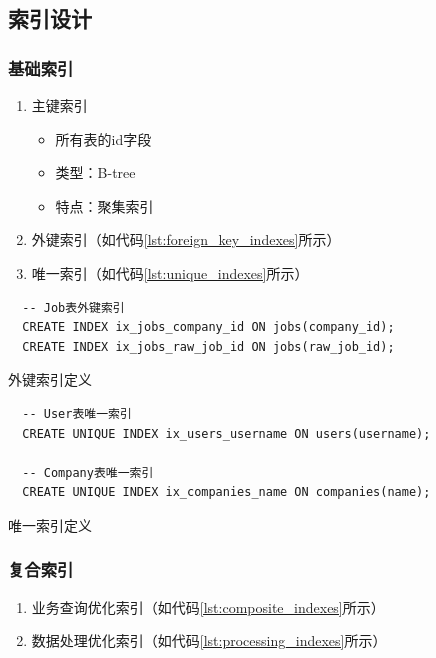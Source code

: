   \subsection{索引设计}
  
  \subsubsection{基础索引}
  
  \begin{enumerate}
    \item 主键索引
    \begin{itemize}
      \item 所有表的id字段
      \item 类型：B-tree
      \item 特点：聚集索引
    \end{itemize}
  
    \item 外键索引（如代码\ref{lst:foreign_key_indexes}所示）
    \item 唯一索引（如代码\ref{lst:unique_indexes}所示）
  \end{enumerate}
  
  \begin{listing}[htbp]
    \begin{verbatim}
  -- Job表外键索引
  CREATE INDEX ix_jobs_company_id ON jobs(company_id);
  CREATE INDEX ix_jobs_raw_job_id ON jobs(raw_job_id);
    \end{verbatim}
    \caption{外键索引定义}\label{lst:foreign_key_indexes}
  \end{listing}
  
  \begin{listing}[htbp]
    \begin{verbatim}
  -- User表唯一索引
  CREATE UNIQUE INDEX ix_users_username ON users(username);
  
  -- Company表唯一索引
  CREATE UNIQUE INDEX ix_companies_name ON companies(name);
    \end{verbatim}
    \caption{唯一索引定义}\label{lst:unique_indexes}
  \end{listing}
  
  \subsubsection{复合索引}
  
  \begin{enumerate}
    \item 业务查询优化索引（如代码\ref{lst:composite_indexes}所示）
    \item 数据处理优化索引（如代码\ref{lst:processing_indexes}所示）
  \end{enumerate}
  
